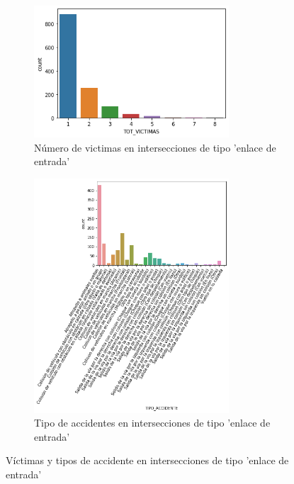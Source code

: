 \begin{figure}[H]
\begin{subfigure}{.5\textwidth}
  \centering
  \includegraphics[width=0.8\textwidth]{imagenes/victimas_caso1-op.png}
  \caption{Número de victimas en intersecciones de tipo 'enlace de entrada'}
  \label{fig:sfig1}
\end{subfigure}%
\begin{subfigure}{.5\textwidth}
  \centering
  \includegraphics[width=0.8\textwidth]{imagenes/tipo_accidente_caso1-op.png}
  \caption{Tipo de accidentes en intersecciones de tipo 'enlace de entrada'}
  \label{fig:sfig2}
\end{subfigure}
\caption{Víctimas y tipos de accidente en intersecciones de tipo 'enlace de entrada'}
\label{fig:fig}
\end{figure}

